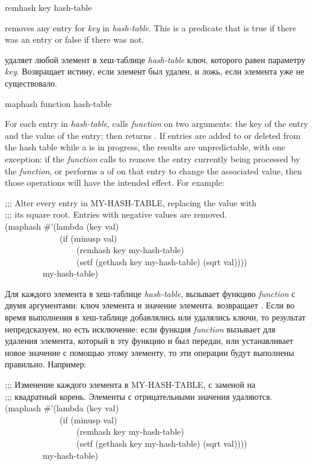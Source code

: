 \begin{defun}[Function]
remhash key hash-table

 removes
any entry for \emph{key} in \emph{hash-table}.  This is a predicate
that is true if there was an
entry or false if there was not.

 удаляет любой элемент в хеш-таблице \emph{hash-table} ключ,
которого равен параметру \emph{key}. Возвращает истину, если элемент был
удален, и ложь, если элемента уже не существовало.
\end{defun}

\begin{defun}[Function]
maphash function hash-table

For each entry in \emph{hash-table},  calls
\emph{function} on two arguments:
the key of the entry and the value of the entry;  then returns .
If entries are added to or deleted from the hash table while a 
is in progress, the results are unpredictable, with one exception:
if the \emph{function} calls  to remove the entry currently
being processed by the \emph{function}, or performs a  of
 on that entry to change the associated value, then those
operations will have the intended effect.
For example:
\begin{lisp}
;;; Alter every entry in MY-HASH-TABLE, replacing the value with \\
;;; its square root.  Entries with negative values are removed. \\
(maphash \#'(lambda (key val) \\
~~~~~~~~~~~~~(if (minusp val) \\
~~~~~~~~~~~~~~~~~(remhash key my-hash-table) \\
~~~~~~~~~~~~~~~~~(setf (gethash key my-hash-table) (sqrt val)))) \\
~~~~~~~~~my-hash-table)
\end{lisp}

Для каждого элемента в хеш-таблице \emph{hash-table},  вызывает
функцию \emph{function} с двумя аргументами:
ключ элемента и
значение элемента.
 возвращает .
Если во время выполнения  в хеш-таблице добавлялись или удалялись
ключи, то результат непредсказуем, но есть исключение:
если функция \emph{function} вызывает  для удаления элемента,
который в эту функцию и был передан, или устанавливает новое значение с помощью
 этому элементу, то эти операции будут выполнены правильно.
Например:
\begin{lisp}
;;; Изменение каждого элемента в MY-HASH-TABLE, с заменой на \\
;;; квадратный корень. Элементы с отрицательными значения удаляются. \\
(maphash \#'(lambda (key val) \\
~~~~~~~~~~~~~(if (minusp val) \\
~~~~~~~~~~~~~~~~~(remhash key my-hash-table) \\
~~~~~~~~~~~~~~~~~(setf (gethash key my-hash-table) (sqrt val)))) \\
~~~~~~~~~my-hash-table)
\end{lisp}


\end{defun}
